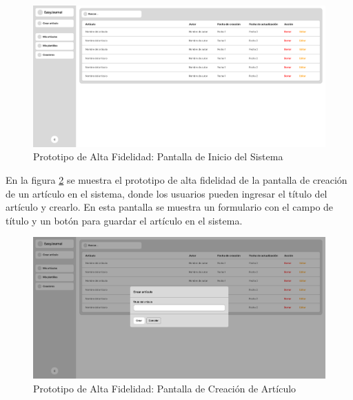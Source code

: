 \begin{figure}[H]
    \centering
    \includegraphics[width=1\textwidth]{IMAGENES/prototipo-dashboard.png}
    \caption{Prototipo de Alta Fidelidad: Pantalla de Inicio del Sistema}
\label{fig:prototipo-dashboard}

\end{figure}

En la figura \ref{fig:prototipo-crear-articulo} se muestra el prototipo de alta fidelidad de la pantalla de creación de un artículo en el sistema, donde los usuarios pueden ingresar el título del artículo y crearlo. En esta pantalla se muestra un formulario con el campo de título y un botón para guardar el artículo en el sistema.

\begin{figure}[H]
    \centering
    \includegraphics[width=1\textwidth]{IMAGENES/prototipo-crear-articulo.png}
    \caption{Prototipo de Alta Fidelidad: Pantalla de Creación de Artículo}
\label{fig:prototipo-crear-articulo}

\end{figure}


